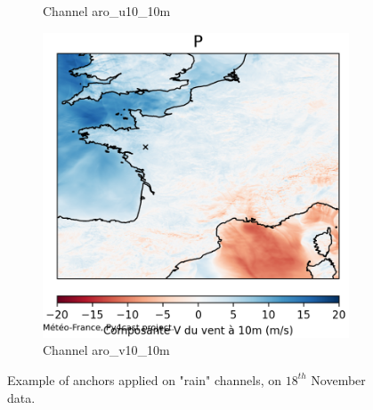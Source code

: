 \begin{figure}[h]
\begin{subfigure}[b]{0.49\textwidth}
        \caption{Channel aro\_u10\_10m}
    \end{subfigure}
    \hfill
    \begin{subfigure}[b]{0.49\textwidth}
        \includegraphics[width=\textwidth]{Images/titan_rain_anchors/nov-18/2023111800_feature_aro_v10_10m.png}
        \caption{Channel aro\_v10\_10m}
    \end{subfigure}
    \caption{Example of anchors applied on "rain" channels, on $18^{th}$ November data.}
    \label{fig:titan-rain-anchors-18}
\end{figure}

